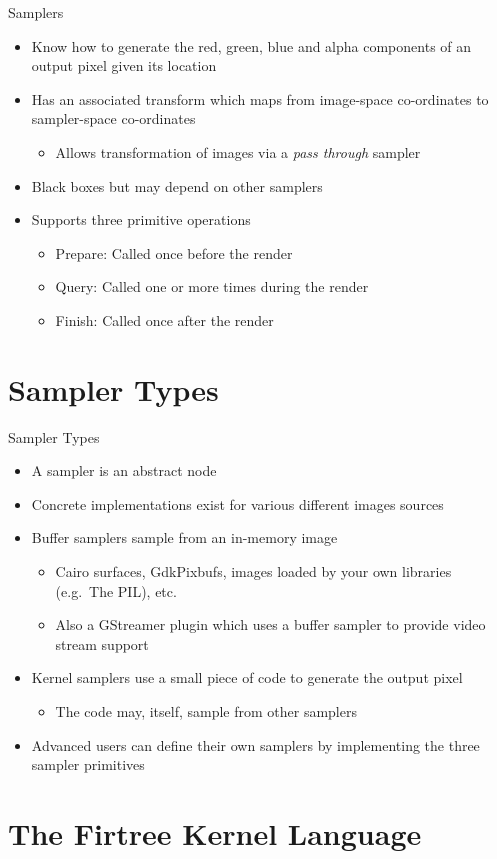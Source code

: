 \documentclass{beamer}
\newcommand{\bi}{\begin{itemize}}
\newcommand{\ei}{\end{itemize}}
\begin{document}
\begin{frame}{Samplers}
  \bi
    \item Know how to generate the red, green, blue and alpha components of
    an output pixel given its location
    \item Has an associated transform which maps from image-space co-ordinates
    to sampler-space co-ordinates
    \bi
      \item Allows transformation of images via a \emph{pass through} sampler
    \ei
    \item Black boxes but may depend on other samplers
    \item Supports three primitive operations
    \bi
      \item Prepare: Called once before the render
      \item Query: Called one or more times during the render
      \item Finish: Called once after the render
    \ei
  \ei
\end{frame}


\section{Sampler Types} %

\begin{frame}{Sampler Types}
  \bi
    \item A sampler is an abstract node
    \item Concrete implementations exist for various different images sources
    \item Buffer samplers sample from an in-memory image
    \bi
      \item Cairo surfaces, GdkPixbufs, images loaded by your own libraries
      (e.g.~The PIL), etc.
      \item Also a GStreamer plugin which uses a buffer sampler to provide
      video stream support
    \ei
    \item Kernel samplers use a small piece of code to generate the output
    pixel
    \bi
      \item The code may, itself, sample from other samplers
    \ei
    \item Advanced users can define their own samplers by implementing the
    three sampler primitives
  \ei
\end{frame}


\section{The Firtree Kernel Language} %
\end{document}
